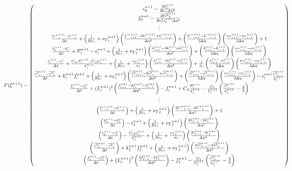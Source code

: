 \documentclass[12pt]{article}
\newcommand{\ep}{\epsilon} \newcommand{\noi}{\noindent}
\newcommand{\secDif}[1]{ \left( \frac{ {#1}_{i+1}^{n+1} - 2 {#1}_{i}^{n+1} +
{#1}_{i-1}^{n+1} }{\Delta \eta^2} \right) }
\newcommand{\secDifEnd}[1]{\left( \frac{2 {#1}_{I-1}^{n+1} - 2 {#1}_I^{n+1}
}{\Delta \eta^2 } \right)}
\newcommand{\Dif}[1]{ \left( \frac{ {#1}_{i+1}^{n+1} - {#1}_{i-1}^{n+1}}{ 2\Delta
\eta} \right)}
\newcommand{\tDif}[1]{ \frac{ {#1}_i^{n+1} - {#1}_i^{n}}{\Delta t}}
\newcommand{\tDifEnd}[1]{ \left( \frac{ {#1}_{I}^{n+1} - {#1}_I^{n}}{\Delta t }
\right)}
\begin{document}
\begin{equation*}
	\hspace{-1in}
	F(\xi^{n+1}) = \left(
	\begin{matrix} 
		\ep_0^{n+1} - \frac{2k_1^{n+1}}{Re_\tau \Delta \eta^2} \\ 
		f_0^{n+1} - \frac{20 \overline{v^2}_1^{n+1}}{Re_\tau^3 \ep_0^{n+1} \Delta \eta^4}\\
		\vdots \\
		\tDif{U^+} + \left(
		\frac{1}{Re_\tau} + {\nu_T}_i^{n+1} \right) \secDif{ {U^+}} +
		\Dif{ U^+} \Dif{\nu_T} + 1 \\ 
		\tDif{k} + \mathcal{P}_i^{n+1} - \ep_i^{n+1} + \left( \frac{1}{Re_\tau} +
		{\nu_T}_{i}^{n+1} \right) \secDif{k} + \Dif{k} \Dif{\nu_T} \\
		\tDif{\ep} +\frac{C_{\ep 1} \mathcal{P}_i^{n+1} -  C_{\ep 2}
		\ep_{i}^{n+1}}{T_i^{n+1}} + \left( \frac{1}{Re_\tau} +
		\frac{ {\nu_T}_{i}^{n+1}}{\sigma_\ep} \right) \secDif{\ep} +
		\frac{1}{\sigma_\ep} \Dif{\ep} \Dif{\nu_T} \\ 
		\tDif{\overline{v^2}} + k_i^{n+1} f_i^{n+1} + \left( \frac{1}{Re_\tau} +
		{\nu_T}_i^{n+1}  \right) \secDif{\overline{v^2}} +
		\Dif{\overline{v^2}} \Dif{\nu_T} - \ep_i^{n+1}
		\frac{ {\overline{v^2}_i^{n+1}}}{k_i^{n+1}} \\
		\tDif{f} + (L_i^{n+1})^2 \secDif{f} - f_i^{n+1} + C_2
		\frac{\mathcal{P}_i^{n+1}}{k_i^{n+1}} -
		\frac{C_1}{T_i^{n+1}} \left( \frac{
			{\overline{v^2}}_i^{n+1}}{k_i^{n+1}} -
			\frac{2}{3} \right) \\
		\vdots \\
		\tDifEnd{U^+} + \left( \frac{1}{Re_\tau} + {\nu_T}_I^{n+1}
		\right) \secDifEnd{U^+} + 1 \\ 
		\tDifEnd{k} - \ep_{I}^{n+1} + \left(
		\frac{1}{Re_\tau} + {\nu_T}_I^{n+1}\right) \secDifEnd{k} \\
		\tDifEnd{\ep} - \frac{C_{\ep 2}
		\ep_I^{n+1}}{T_I^{n+1}} + \left( \frac{1}{Re_\tau} +
		\frac{ {\nu_T}_I^{n+1}}{\sigma \ep} \right) \secDifEnd{\ep} \\
		\tDifEnd{\overline{v^2}} + k_I^{n+1} f_{I}^{n+1} + \left(
		\frac{1}{Re_\tau} + {\nu_T}_I^{n+1} \right)
		\secDifEnd{\overline{v^2}} \\
		\tDifEnd{f} + \left( L_i^{n+1} \right)^2 \secDifEnd{f} -
		f_I^{n+1} - \frac{C_1}{T_{I}^{n+1}} \left(
		\frac{\overline{v^2}_I^{n+1}}{k_I^{n+1}} - \frac{2}{3} \right)
	\end{matrix}
	\right)
\end{equation*}
\end{document}

